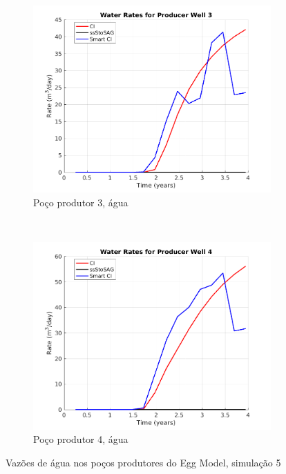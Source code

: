 \begin{figure}[!ht]
	\begin{subfigure}[b]{.3\textwidth}
		\includegraphics[width=\textwidth]{figs/resultadosEgg/imgsim5/EGG_WaterWell3_Zoom}
		\caption{Po\c{c}o produtor 3, \'{a}gua}
		\label{EGG5_WaterWell3}
	\end{subfigure}
	~
	\begin{subfigure}[b]{.3\textwidth}
		\includegraphics[width=\textwidth]{figs/resultadosEgg/imgsim5/EGG_WaterWell4_Zoom}
		\caption{Po\c{c}o produtor 4, \'{a}gua}
		\label{EGG5_WaterWell4}
	\end{subfigure}
	\caption{Vaz\~{o}es de \'{a}gua nos po\c{c}os produtores do Egg Model, simula\c{c}\~{a}o 5}
	\label{EGG5_WaterRates}
\end{figure}